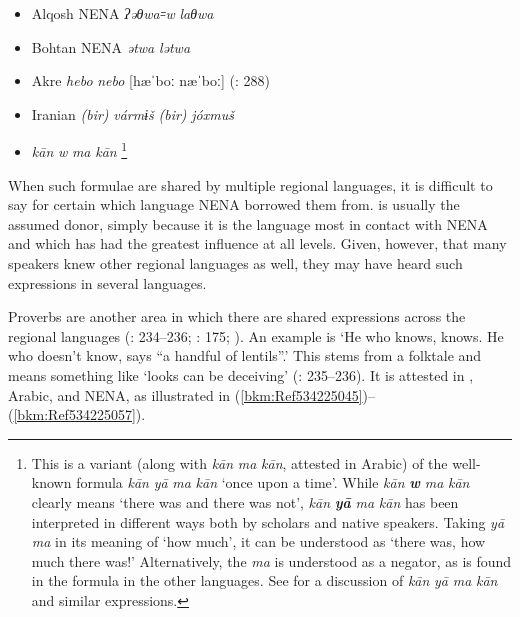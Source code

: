 \documentclass[output=paper]{langsci/langscibook}
\begin{document}
\begin{itemize}[noitemsep]

\item[]  Alqosh NENA   \textit{ʔəθwa꞊w} \textit{laθwa} \citep[268]{Coghill2009}

\item[]  Bohtan NENA   \textit{ətwa} \textit{lətwa} \citep{Fox2009}

\item[] Akre    \textit{hebo} \textit{nebo} [hæˈboː næˈboː] (\citealt{MacKenzie1962}: 288) 

\item[] Iranian    \textit{(bir)} \textit{vármɨš} \textit{(bir)} \textit{jóxmuš} \citep[175]{Garbell1965}

\item[]    \textit{kān} \textit{w} \textit{ma} \textit{kān} \citep[404]{Jastrow1981}\footnote{This is a variant (along with \textit{kān} \textit{ma} \textit{kān}, attested in  Arabic) of the well-known formula \textit{kān} \textit{yā} \textit{ma} \textit{kān} ‘once upon a time’. While \textit{kān} \textbf{\textit{w}} \textit{ma} \textit{kān} clearly means ‘there was and there was not’, \textit{kān} \textbf{\textit{yā}} \textit{ma} \textit{kān} has been interpreted in different ways both by scholars and native speakers. Taking \textit{yā} \textit{ma} in its meaning of ‘how much’, it can be understood as ‘there was, how much there was!’ Alternatively, the \textit{ma} is understood as a negator, as is found in the formula in the other languages. See \citet{Lentin1995} for a discussion of \textit{kān} \textit{yā} \textit{ma} \textit{kān} and similar expressions.}
\end{itemize}

When such formulae are shared by multiple regional languages, it is difficult to say for certain which language NENA borrowed them from.  is usually the assumed donor, simply because it is the language most in contact with NENA and which has had the greatest influence at all levels. Given, however, that many speakers knew other regional languages as well, they may have heard such expressions in several languages.

Proverbs are another area in which there are shared expressions across the regional languages (\citealt{Chyet1995}: 234–236; \citealt{Garbell1965}: 175; \citealt{Segal1955}). An example is ‘He who knows, knows. He who doesn’t know, says “a handful of lentils”.’ This stems from a folktale and means something like ‘looks can be deceiving’ (\citealt{Chyet1995}: 235–236). It is attested in ,  Arabic, and NENA, as illustrated in (\ref{bkm:Ref534225045})–(\ref{bkm:Ref534225057}).
\end{document}
